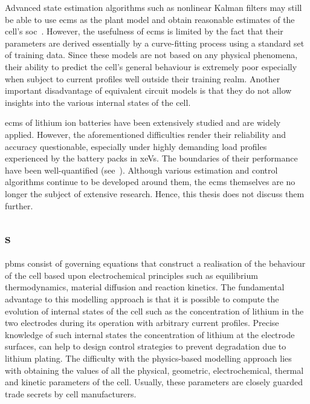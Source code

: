 Advanced state estimation algorithms such  as nonlinear Kalman filters may still
be able to use \glspl{ecm} as the plant model and obtain reasonable estimates of
the  cell's  \gls{soc}~\cite{Plett2006,  Sun2011}. However,  the  usefulness  of
\glspl{ecm} is limited by the fact that their parameters are derived essentially
by a  curve-fitting process using a  standard set of training  data. Since these
models are  not based on  any physical phenomena,  their ability to  predict the
cell's general behaviour  is extremely poor especially when  subject to current
profiles well  outside their training  realm. Another important  disadvantage of
equivalent circuit  models is that they  do not allow insights  into the various
internal states of the cell.

\glspl{ecm}  of  lithium  ion  batteries   have  been  extensively  studied  and
are  widely  applied.  However,  the aforementioned  difficulties  render  their
reliability and  accuracy questionable,  especially under highly  demanding load
profiles  experienced by  the battery  packs in  \glspl{xeV}. The  boundaries of
their  performance have  been well-quantified  (see~\cite{Plett2015,Plett2016}).
Although  various estimation  and control  algorithms continue  to be  developed
around them, the  \glspl{ecm} themselves are no longer the  subject of extensive
research. Hence, this thesis does not discuss them further.

\subsection{s}\label{subsec:pbms}


\glspl{pbm} consist of  governing equations that construct a  realisation of the
behaviour of the cell based  upon electrochemical principles such as equilibrium
thermodynamics,  material  diffusion  and  reaction  kinetics.  The  fundamental
advantage  to this  modelling approach  is that  it is  possible to  compute the
evolution of  internal states of  the cell  such as the concentration of lithium
in the two electrodes during its operation with arbitrary current  profiles.
Precise knowledge of such internal states \eg{} the concentration of lithium at
the electrode surfaces, can help to design control strategies to prevent
degradation due to lithium plating.  The difficulty with  the physics-based 
modelling approach  lies with  obtaining the values  of all  the physical, 
geometric, electrochemical,  thermal and  kinetic parameters  of the  cell.
Usually,  these parameters  are closely  guarded trade secrets by cell
manufacturers.


